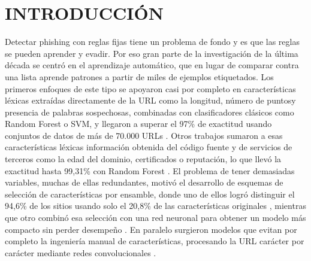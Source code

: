 \section{INTRODUCCIÓN}

 Detectar phishing con reglas fijas tiene un problema de fondo y es que las reglas se pueden aprender y evadir. Por eso gran parte de la investigación de la última década se centró en el aprendizaje automático, que en lugar de comparar contra una lista aprende patrones a partir de miles de ejemplos etiquetados. Los primeros enfoques de este tipo se apoyaron casi por completo en características léxicas extraídas directamente de la URL como la longitud, número de puntosy presencia de palabras sospechosas, combinadas con clasificadores clásicos como Random Forest o SVM, y llegaron a superar el 97\% de exactitud usando conjuntos de datos de más de 70.000 URLs \cite{sahingoz2019machine}. Otros trabajos sumaron a esas características léxicas información obtenida del código fuente y de servicios de terceros como la edad del dominio, certificados o reputación, lo que llevó la exactitud hasta 99,31\% con Random Forest \cite{rao2019detection}. El problema de tener demasiadas variables, muchas de ellas redundantes, motivó el desarrollo de esquemas de selección de características por ensamble, donde uno de ellos logró distinguir el 94,6\% de los sitios usando solo el 20,8\% de las características originales \cite{chiew2019hybrid}, mientras que otro combinó esa selección con una red neuronal para obtener un modelo más compacto sin perder desempeño \cite{zhu2019ofsnn}. En paralelo surgieron modelos que evitan por completo la ingeniería manual de características, procesando la URL carácter por carácter mediante redes convolucionales \cite{aljofey2020effective}. \newline

